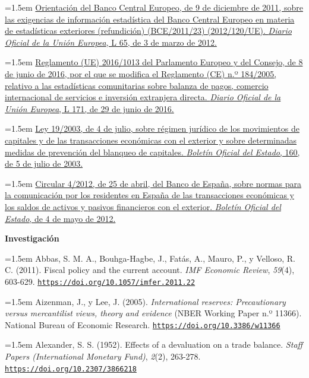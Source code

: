 \documentclass[10pt,a4paper]{article}
\begin{document}
\noindent\hangindent=1.5em \href{https://eur-lex.europa.eu/eli/guideline/2012/120/oj}{Orientación del Banco Central Europeo, de 9 de diciembre de 2011, sobre las exigencias de información estadística del Banco Central Europeo en materia de estadísticas exteriores (refundición) (BCE/2011/23) (2012/120/UE). \textit{Diario Oficial de la Unión Europea}, L 65, de 3 de marzo de 2012.}

\noindent\hangindent=1.5em \href{https://eur-lex.europa.eu/eli/reg/2016/1013/oj}{Reglamento (UE) 2016/1013 del Parlamento Europeo y del Consejo, de 8 de junio de 2016, por el que se modifica el Reglamento (CE) n.º 184/2005, relativo a las estadísticas comunitarias sobre balanza de pagos, comercio internacional de servicios e inversión extranjera directa. \textit{Diario Oficial de la Unión Europea}, L 171, de 29 de junio de 2016.}

\noindent\hangindent=1.5em \href{https://www.boe.es/eli/es/l/2003/07/04/19}{Ley 19/2003, de 4 de julio, sobre régimen jurídico de los movimientos de capitales y de las transacciones económicas con el exterior y sobre determinadas medidas de prevención del blanqueo de capitales. \textit{Boletín Oficial del Estado}, 160, de 5 de julio de 2003.}

\noindent\hangindent=1.5em \href{https://www.boe.es/boe/dias/2012/05/04/pdfs/BOE-A-2012-5920.pdf}{Circular 4/2012, de 25 de abril, del Banco de España, sobre normas para la comunicación por los residentes en España de las transacciones económicas y los saldos de activos y pasivos financieros con el exterior. \textit{Boletín Oficial del Estado}, de 4 de mayo de 2012.}

\textbf{Investigación}

\noindent\hangindent=1.5em Abbas, S. M. A., Bouhga-Hagbe, J., Fatás, A., Mauro, P., y Velloso, R. C. (2011). Fiscal policy and the current account. \textit{IMF Economic Review}, \textit{59}(4), 603-629. \href{https://doi.org/10.1057/imfer.2011.22}{\nolinkurl{https://doi.org/10.1057/imfer.2011.22}}

\noindent\hangindent=1.5em Aizenman, J., y Lee, J. (2005). \textit{International reserves: Precautionary versus mercantilist views, theory and evidence} (NBER Working Paper n.º 11366). National Bureau of Economic Research. \href{https://doi.org/10.3386/w11366}{\nolinkurl{https://doi.org/10.3386/w11366}}

\noindent\hangindent=1.5em Alexander, S. S. (1952). Effects of a devaluation on a trade balance. \textit{Staff Papers (International Monetary Fund)}, \textit{2}(2), 263-278. \href{https://doi.org/10.2307/3866218}{\nolinkurl{https://doi.org/10.2307/3866218}}
\end{document}
